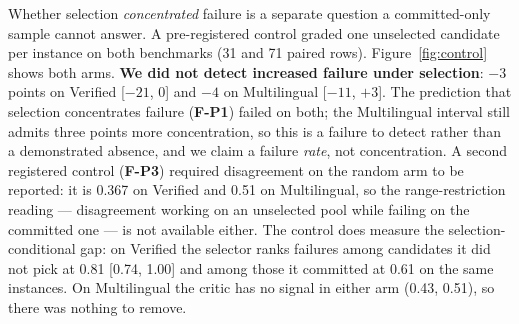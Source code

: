 \documentclass[10pt]{article}
\begin{document}
Whether selection \emph{concentrated} failure is a separate question a committed-only sample cannot answer. A pre-registered control graded one unselected candidate per instance on both benchmarks (31 and 71 paired rows). Figure~\ref{fig:control} shows both arms. \textbf{We did not detect increased failure under selection}: $-3$ points on Verified [$-21$, $0$] and $-4$ on Multilingual [$-11$, $+3$]. The prediction that selection concentrates failure (\textbf{F-P1}) failed on both; the Multilingual interval still admits three points more concentration, so this is a failure to detect rather than a demonstrated absence, and we claim a failure \emph{rate}, not concentration. A second registered control (\textbf{F-P3}) required disagreement on the random arm to be reported: it is 0.367 on Verified and 0.51 on Multilingual, so the range-restriction reading --- disagreement working on an unselected pool while failing on the committed one --- is not available either. The control does measure the selection-conditional gap: on Verified the selector ranks failures among candidates it did not pick at 0.81 [0.74, 1.00] and among those it committed at 0.61 on the same instances. On Multilingual the critic has no signal in either arm (0.43, 0.51), so there was nothing to remove.
\end{document}
